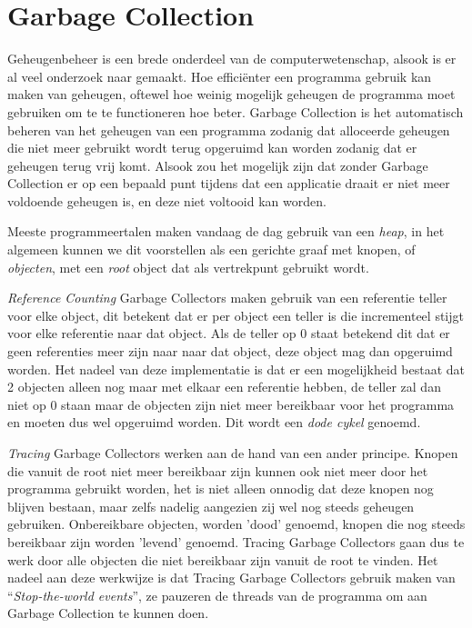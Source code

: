 \section{Garbage Collection}
\label{sec:Garbage collection}
Geheugenbeheer is een brede onderdeel van de computerwetenschap, alsook is er al veel onderzoek naar gemaakt.
Hoe efficiënter een programma gebruik kan maken van geheugen, oftewel hoe weinig mogelijk geheugen de programma moet gebruiken om te te functioneren hoe beter.
Garbage Collection is het automatisch beheren van het geheugen van een programma zodanig dat alloceerde geheugen die niet meer gebruikt wordt terug opgeruimd kan worden zodanig dat er geheugen terug vrij komt.
Alsook zou het mogelijk zijn dat zonder Garbage Collection er op een bepaald punt tijdens dat een applicatie draait er niet meer voldoende geheugen is, en deze niet voltooid kan worden.

Meeste programmeertalen maken vandaag de dag gebruik van een \textit{heap}, in het algemeen kunnen we dit voorstellen als een gerichte graaf met knopen, of \textit{objecten}, met een \textit{root} object dat als vertrekpunt gebruikt wordt.

\textit{Reference Counting} Garbage Collectors maken gebruik van een referentie teller voor elke object, dit betekent dat er per object een teller is die incrementeel stijgt voor elke referentie naar dat object.
Als de teller op 0 staat betekend dit dat er geen referenties meer zijn naar naar dat object, deze object mag dan  opgeruimd worden.
Het nadeel van deze implementatie is dat er een mogelijkheid bestaat dat 2 objecten alleen nog maar met elkaar een referentie hebben, de teller zal dan niet op 0 staan maar de objecten zijn niet meer bereikbaar voor het programma en moeten dus wel opgeruimd worden.
Dit wordt een \textit{dode cykel} genoemd.\autocite{VanderCruysse2019}

\textit{Tracing} Garbage Collectors werken aan de hand van een ander principe.
Knopen die vanuit de root niet meer bereikbaar zijn kunnen ook niet meer door het programma gebruikt worden, het is niet alleen onnodig dat deze knopen nog blijven bestaan, maar zelfs nadelig aangezien zij wel nog steeds geheugen gebruiken.
Onbereikbare objecten, worden 'dood' genoemd, knopen die nog steeds bereikbaar zijn worden 'levend' genoemd.
Tracing Garbage Collectors gaan dus te werk door alle objecten die niet bereikbaar zijn vanuit de root te vinden. 
Het nadeel aan deze werkwijze is dat Tracing Garbage Collectors gebruik maken van ``\textit{Stop-the-world events}'', ze pauzeren de threads van de programma om aan Garbage Collection te kunnen doen.

